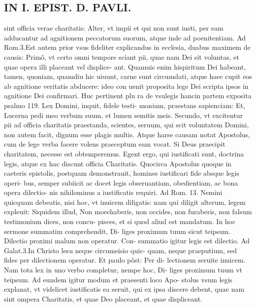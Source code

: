 \documentclass{article}
\begin{document}
\begin{pages}
\section*{IN I. EPIST. D. PAVLI. }
\marginpar{[ p.25 ]}\pstart sint officia verae charitatis: Alter, vt impii et qui non sunt iusti, per eam adducantur ad agnitionem peccatorum suorum, atque  inde ad poenitentiam. Ad Rom.3.Est autem prior vsus fideliter explicandus in ecclesia, duabus maximem de causis: Primô, vt certo omni tempore sciant pii, quae nam Dei sit voluntas, et quae opera illi placeant vel displice- ant. Quamuis enim hispiritum Dei habeant, tamen, quoniam, quamdiu hic uiuunt, carne sunt circumdati, atque haec cupit eos ab agnitione veritatis abducere: ideo con uenit proposita lege Dei scripta ipsos in agnitione Dei confirmari. Huc pertinent plu ra de vsulegis hancin partem exposita psalmo 119. Lex Domini, inquit, fidele testi- monium, praestans sapienciam: Et, Lucerna pedi meo verbum suum, et lumen semitis meis. Secundo, vt excitentur pii ad officia charitatis praestanda, scientes, seruum, qui scit voluntatem Domini, non autem facit, dignum esse plagis multis. Atque harse causam notat Apostolus, cum de lege verba facere volens praeceptum eam vocat. Si Deus praecipit charitatem, necesse est obtemperemus. Egent ergo, qui iustificati sunt, doctrina legis, atque  ex hac discunt officia Charitatis. Quocirca Apostolus quoque in caeteris epistolis, postquam demonstrauit, homines iustificari fide absque  legis operi- bus, semper subiicit ac docet legis obseruantiam, obedientiam, ac bona opera dilectio- nis nihilominus a iustificatis requiri. Ad Rom. 13. Nemini quicquam debeatis, nisi hoc, vt inuicem diligatis: nam qui diligit alterum, legem expleuit: Siquidem illud, Non moechaberis, non occides, non furaberis, non falsum testimonium dices, non concu- pisces, et si quod aliud est mandatum. In hoc sermone summatim comprehendit, Di- liges proximum tuum sicut teipsum. Dilectio proximi malum non operatur. Con- summatio igitur legis est dilectio. Ad Galat.3.In Christo lesu neque circumeisio quic- quam, neque praeputium, sed fides per dilectionem operatur. Et paulo pôst: Per di- lectionem seruite inuicem. Nam tota lex in uno verbo completur, nempe hoc, Di- liges proximum tuum vt teipsum. Ad eundem igitur modum et praesenti loco Apo- stolus vsum legis explanat, vt videlicet iustificatis ea seruit, qui ex ipsa discere debent, quae nam sint ompera Charitatis, et quae Deo placeant, et quae displiceant.  \pend
{}
{}

\end{pages}
\end{document}

